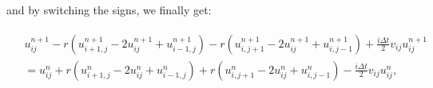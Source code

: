 \documentclass[english,notitlepage,reprint,nofootinbib]{revtex4-1}  %
\begin{document}
	and by switching the signs, we finally get:
	
	\begin{align} \label{eq:crank}
		\begin{split}
			&u_{ij}^{n+1}  -  r \left(u_{i+1,j}^{n+1} - 2u_{ij}^{n+1} + u_{i-1,j}^{n+1}\right)  -  r \left(u_{i,j+1}^{n+1} - 2u_{ij}^{n+1} + u_{i,j-1}^{n+1}\right)  +  \frac{i \Delta t}{2} v_{ij} u_{ij}^{n+1} \\
			&= u_{ij}^n  +  r \left(u_{i+1,j}^n - 2u_{ij}^n + u_{i-1,j}^n\right)  +  r \left(u_{i,j+1}^n - 2u_{ij}^n + u_{i,j-1}^n\right)  -  \frac{i \Delta t}{2} v_{ij} u_{ij}^n,
		\end{split}    
	\end{align}
	
	
	
	
\end{document}

